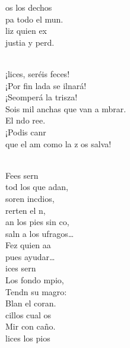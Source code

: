 \documentclass[12pt]{article}
\begin{document}
\begin{multicols*}{2}
\begin{cancion}
	os los dechos\\
	pa todo el mun.\\
	liz quien ex\\
	justia y perd. \\\jump\\
	\begin{chorus}%
	¡lices, seréis feces! \\
	¡Por fin lada se ilnará!\\
	¡Seomperá la trisza!\\
	Sois mil anchas que van a mbrar.\\
	El ndo ree.\\
	¡Podis canr\\
	que el am como la z os salva!\\
	\end{chorus}%
	\jump\\
	Fees sern\\
	tod los que adan,\\
	soren incdios,\\
	rerten el n,\\
	an los pies sin co,\\
	saln a los ufragos… \\
	Fez quien aa\\
	pues  ayudar…\\
\jump
	ices sern\\
	Los  fondo mpio,\\
	Tendn su magro:\\
	Blan el coran. \\
	cillos cual os \\
	Mir con caño.\\
	lices los pios\\

\end{cancion}
\end{multicols*}
\end{document}
